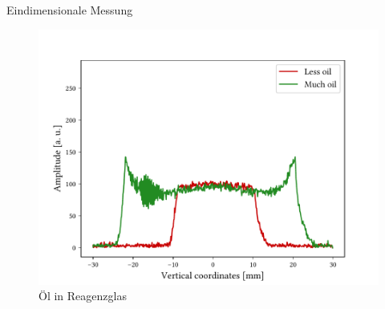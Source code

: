 \begin{frame}{Eindimensionale Messung}
	\begin{figure} %
	\centering
	\includegraphics[scale=.55]{..//figures//f61_abb_8.pdf}
	\caption{Öl in Reagenzglas}
	\end{figure}
\end{frame}

